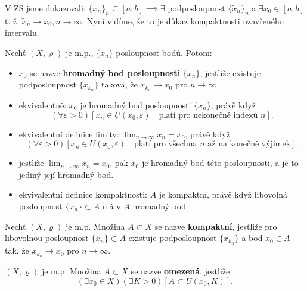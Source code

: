 \begin{poznamka}
  V ZS jsme dokazovali: $\{x_n\}_n \subseteq [a,b] \implies \exists$ podposloupnost $\{\tilde{x}_n\}_n$ a $\exists x_0 \in [a,b]$ t. ž. $\tilde{x}_n \to x_0, n\to \infty$. Nyní vidíme, že to je důkaz kompaktnosti uzavřeného intervalu.
\end{poznamka}

\begin{definice}
Nechť $(X, \varrho)$ je m.p., $\{x_n\}$ posloupnost bodů. Potom:

\begin{itemize}
    \item $x_0$ se nazve \textbf{hromadný bod posloupnosti} $\{x_n\}$, jestliže existuje podposloupnost $\{x_{k_n}\}$ taková, že $x_{k_n} \to x_0$ pro $n \to \infty$

    \item ekvivalentně: $x_0$ je hromadný bod posloupnosti $\{x_n\}$, právě když
    \[
    \left(\forall \varepsilon > 0\right) \left[ x_n \in U(x_0, \varepsilon) \quad \text{platí pro nekonečně indexů } n \right].
    \]

    \item ekvivalentní definice limity: $\lim_{n\to \infty}x_n = x_0$, právě když
    \[
    \left(\forall \varepsilon > 0\right) \left[ x_n \in U(x_0, \varepsilon) \quad \text{platí pro všechna } n \text{ až na konečně výjimek} \right].
    \]

    \item jestliže $\lim_{n\to \infty}x_n = x_0$, pak $x_0$ je hromadný bod této posloupnosti, a je to jediný její hromadný bod.

    \item ekvivalentní definice kompaktnosti: $A$ je kompaktní, právě když libovolná posloupnost $\{x_n\} \subset A$ má v $A$ hromadný bod
\end{itemize}
\end{definice}

\begin{definice}
Nechť $(X, \varrho)$ je m.p. Množina $A \subset X$ se nazve \textbf{kompaktní}, jestliže pro libovolnou posloupnost $\{x_n\} \subset A$ existuje podposloupnost $\{x_{k_n}\}$ a bod $x_0 \in A$ tak, že $x_{k_n} \to x_0$ pro $n \to \infty$.
\end{definice}

\begin{definice}
$(X, \varrho)$ je m.p. Množina $A \subset X$ se nazve \textbf{omezená}, jestliže
\[
\left(\exists x_0 \in X\right) \left(\exists K > 0\right) \left[ A \subset U(x_0, K) \right].
\]
\end{definice}

